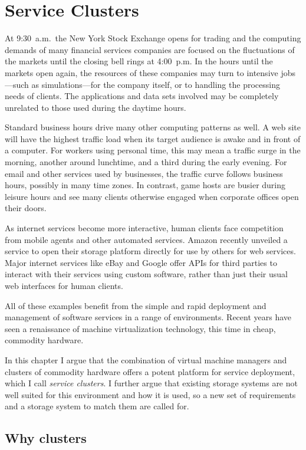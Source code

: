 \chapter{Service Clusters}

At 9:30~a.m.\ the New York Stock Exchange opens for trading and the computing demands of many financial services companies are focused on the fluctuations of the markets until the closing bell rings at 4:00~p.m. In the hours until the markets open again, the resources of these companies may turn to intensive jobs---such as simulations---for the company itself, or to handling the processing needs of clients. The applications and data sets involved may be completely unrelated to those used during the daytime hours.

Standard business hours drive many other computing patterns as well. A web site will have the highest traffic load when its target audience is awake and in front of a computer. For workers using personal time, this may mean a traffic surge in the morning, another around lunchtime, and a third during the early evening. For email and other services used by businesses, the traffic curve follows business hours, possibly in many time zones. In contrast, game hosts are busier during leisure hours and see many clients otherwise engaged when corporate offices open their doors.

As internet services become more interactive, human clients face competition from mobile agents and other automated services. Amazon recently unveiled a service to open their storage platform directly for use by others for web services. Major internet services like eBay and Google offer APIs for third parties to interact with their services using custom software, rather than just their usual web interfaces for human clients.

All of these examples benefit from the simple and rapid deployment and management of software services in a range of environments. Recent years have seen a renaissance of machine virtualization technology, this time in cheap, commodity hardware.

In this chapter I argue that the combination of virtual machine managers and clusters of commodity hardware offers a potent platform for service deployment, which I call \textit{service clusters}. I further argue that existing storage systems are not well suited for this environment and how it is used, so a new set of requirements and a storage system to match them are called for.

\section{Why clusters}

